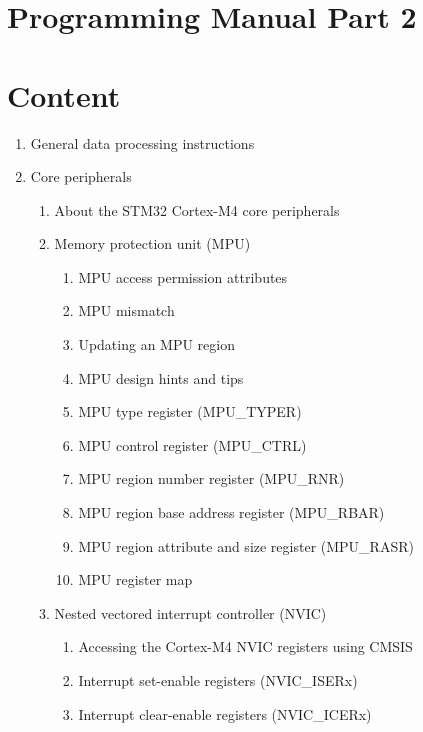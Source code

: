 \documentclass{article}
\begin{document}
\section*{Programming Manual Part 2}

\tableofcontents

\section*{Content}
\begin{enumerate}
    \item General data processing instructions 
    \item Core peripherals 
    \begin{enumerate}
        \item About the STM32 Cortex-M4 core peripherals 
        \item Memory protection unit (MPU) 
        \begin{enumerate}
            \item MPU access permission attributes 
            \item MPU mismatch 
            \item Updating an MPU region 
            \item MPU design hints and tips 
            \item MPU type register (MPU\_TYPER) 
            \item MPU control register (MPU\_CTRL) 
            \item MPU region number register (MPU\_RNR) 
            \item MPU region base address register (MPU\_RBAR) 
            \item MPU region attribute and size register (MPU\_RASR) 
            \item MPU register map 
        \end{enumerate}
        \item Nested vectored interrupt controller (NVIC) 
        \begin{enumerate}
            \item Accessing the Cortex-M4 NVIC registers using CMSIS 
            \item Interrupt set-enable registers (NVIC\_ISERx) 
            \item Interrupt clear-enable registers (NVIC\_ICERx) 

\end{enumerate}
\end{enumerate}
\end{enumerate}
\end{document}
